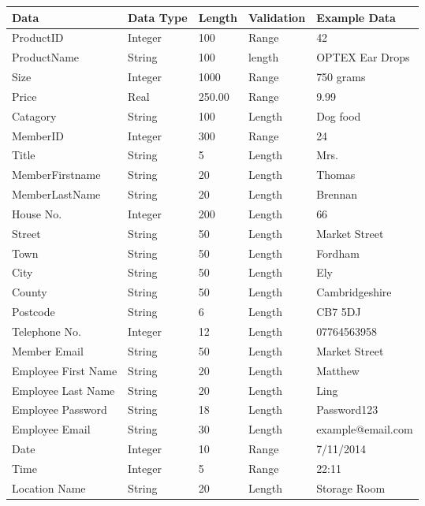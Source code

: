     \begin{tabular}{|p{3cm}|p{3cm}|p{2cm}|p{3cm}|p{3cm}|}
        \hline
        \textbf{Data} & \textbf{Data Type} & \textbf{Length} & \textbf{Validation} & \textbf{Example Data}\\ \hline
	ProductID & Integer & 100 & Range & 42 \\ \hline
	ProductName & String & 100 & length & OPTEX Ear Drops \\ \hline
	Size & Integer & 1000 & Range & 750 grams \\ \hline
          Price & Real & 250.00 & Range & 9.99 \\ \hline
          Catagory & String & 100 & Length & Dog food \\ \hline
          MemberID & Integer & 300 & Range & 24 \\ \hline
	Title & String & 5 & Length & Mrs. \\ \hline
          MemberFirstname & String & 20 & Length & Thomas \\ \hline
          MemberLastName & String & 20 & Length & Brennan \\ \hline
          House No. & Integer & 200 & Length & 66 \\ \hline
	Street & String & 50 & Length & Market Street \\ \hline
	Town & String & 50 & Length & Fordham \\ \hline
         City & String & 50 & Length & Ely \\ \hline
         County & String & 50 & Length & Cambridgeshire \\ \hline
         Postcode & String & 6 & Length & CB7 5DJ \\ \hline
         Telephone No. & Integer & 12 & Length & 07764563958 \\ \hline
	Member Email & String & 50 & Length & Market Street \\ \hline
	Employee First Name & String & 20 & Length & Matthew \\ \hline
	Employee Last Name & String & 20 & Length & Ling \\ \hline
	Employee Password & String & 18 & Length & Password123 \\ \hline
	Employee Email & String & 30 & Length & example@email.com \\ \hline
	Date & Integer & 10 & Range & 7/11/2014 \\ \hline
	Time & Integer & 5 & Range & 22:11 \\ \hline
	Location Name & String & 20 & Length & Storage Room \\ \hline
	
  \end{tabular}

